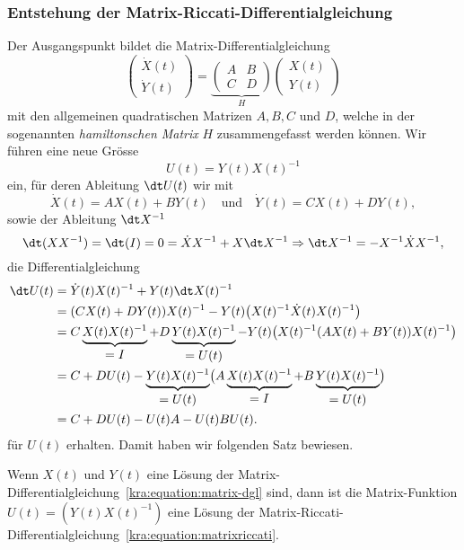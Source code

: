 \subsubsection{Entstehung der Matrix-Riccati-Differentialgleichung}
Der Ausgangspunkt bildet die Matrix-Differentialgleichung
\begin{equation}
    \label{kra:equation:matrix-dgl}
    \begin{pmatrix}
        \dot{X}(t) \\
        \dot{Y}(t)
    \end{pmatrix}
    =
    \underbrace{
        \begin{pmatrix}
            A & B \\
            C & D
        \end{pmatrix}
    }_{\displaystyle{H}}
    \begin{pmatrix}
        X(t) \\
        Y(t)
    \end{pmatrix}
\end{equation}
mit den allgemeinen quadratischen Matrizen $A, B, C$ und $D$,
welche in der sogenannten {\em hamiltonschen Matrix} $H$
zusammengefasst werden können.
Wir führen eine neue Grösse
\[
U(t) = Y(t)X(t)^{-1}
\]
ein, für deren Ableitung $\dt U(t)$ wir mit
\[
\dot{X}(t) = AX(t) + BY(t) \quad \text{und} \quad \dot{Y}(t) = CX(t) + DY(t),
\]
sowie der Ableitung $\dt X^{-1}$
\[
\dt (X X^{-1}) = \dt (I) = 0 = \dot{X} X^{-1} + X \dt X^{-1} \Rightarrow \dt X^{-1} = - X^{-1} \dot{X} X^{-1},
\]
die Differentialgleichung
\begin{equation}
    \label{kra:equation:feder-masse-riccati-matrix}
    \begin{split}
        \dt U(t)   &= \dot{Y}(t) X(t)^{-1} + Y(t) \dt X(t)^{-1} \\
        &=
	(CX(t) + DY(t)) X(t)^{-1}
	- Y(t) \bigl(X(t)^{-1} \dot{X}(t) X(t)^{-1}\bigr) \\
        &=
	C\underbrace{X(t)X(t)^{-1}}_{\displaystyle =I}
	+
	D\underbrace{Y(t)X(t)^{-1}}_{\displaystyle =U(t)}
	-
	Y(t)\bigl(X(t)^{-1} (AX(t) + BY(t)) X(t)^{-1}\bigr) \\
        &=
	C + DU(t)
	- \underbrace{Y(t)X(t)^{-1}}_{\displaystyle =U(t)} \bigl(A\underbrace{X(t)X(t)^{-1}}_{\displaystyle =I}
	+ B\underbrace{Y(t)X(t)^{-1}}_{\displaystyle =U(t)}\bigr) \\
        &= C  + DU(t) - U(t)A - U(t)BU(t).
    \end{split}
\end{equation}
für $U(t)$
erhalten.
Damit haben wir folgenden Satz bewiesen.
\begin{satz}
    \label{kra:satz:riccati-matrix-dgl}
Wenn $X(t)$ und $Y(t)$ eine Lösung der
Matrix-Differentialgleichung~\eqref{kra:equation:matrix-dgl}
sind, dann ist die Matrix-Funktion
$U(t) = (Y(t)X(t)^{-1})$
eine Lösung der
Matrix-Riccati-Differentialgleichung~\eqref{kra:equation:matrixriccati}.
\end{satz}

